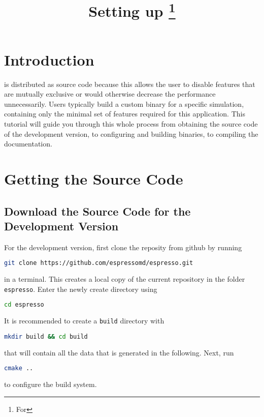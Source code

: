 \documentclass[
paper=a4,                       %
fontsize=11pt,                  %
headinclude=false,              %
footinclude=false,              %
pagesize,                       %
]{scrartcl}
\begin{document}
\esptitlehead

\title{Setting up \es{}
\ifdefined\esversion%
\thanks{For \es \esversion}%
\fi%
}
\author{}

\maketitle

\section{Introduction}
\es{} is distributed as source code because this allows the user to disable features that are mutually exclusive or would otherwise decrease the performance unnecessarily. Users typically  build a custom \es{} binary for a specific simulation, containing only the minimal set of features required for this application. This tutorial will guide you through this whole process  from obtaining the source code of the development version, to configuring and building binaries, to compiling the documentation.

\section{Getting the Source Code}
\subsection{Download the Source Code for the Development Version}
%
For the development version, first clone the \es{} reposity from github by running
\begin{lstlisting}[language=bash]
git clone https://github.com/espressomd/espresso.git
\end{lstlisting}
%
in a terminal. This creates a local copy of the current \es{} repository in the folder \verb!espresso!.
Enter the newly create directory using
\begin{lstlisting}[language=bash]
cd espresso
\end{lstlisting}
It is recommended to create a \verb!build! directory with
\begin{lstlisting}[language=bash]
mkdir build && cd build
\end{lstlisting}
that will contain all the data that is generated in the following. Next, run
\begin{lstlisting}[language=bash]
cmake ..
\end{lstlisting}
to configure the build system.
\end{document}
